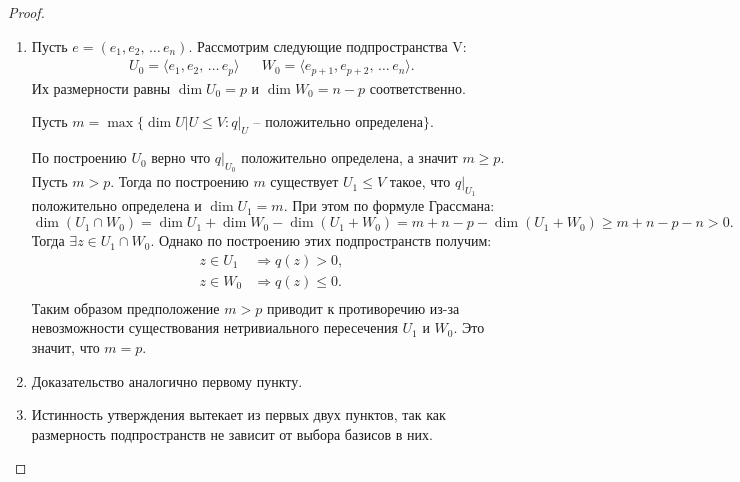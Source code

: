 \begin{proof}~
    \begin{enumerate}
        \item Пусть $e = (e_1, e_2, \, \dots \,e_n)$. Рассмотрим следующие подпространства V:
        \begin{align*}
            U_0 = \langle e_1, e_2, \, \dots \,e_p \rangle && W_0 = \langle e_{p+1}, e_{p+2}, \, \dots \,e_n\rangle. 
        \end{align*}
        Их размерности равны $\dim U_0 = p$ и $\dim W_0 = n-p$ соответственно.

        Пусть $m = \max \{ \dim U \vert U \leq V: q\vert_U \text{ -- положительно определена}\}$.

        По построению $U_0$ верно что $q \vert_{U_0}$ положительно определена, а значит $m \geq p$. Пусть $m > p$.
        Тогда по построению $m$ существует $U_1  \leq V$ такое, что $q \vert_{U_1}$ положительно определена
        и $\dim U_1 = m$.
        При этом по формуле Грассмана: 
        $$\dim (U_1 \cap W_0) = \dim U_1 + \dim W_0  - \dim (U_1 + W_0) = m + n - p - \dim (U_1 + W_0) \geq 
        m + n - p - n > 0.$$
        Тогда $\exists z \in U_1 \cap W_0$. Однако по построению этих подпространств получим:
        \begin{align*}
            z \in U_1 \, & \Rightarrow q(z) > 0, \\
            z \in W_0 & \Rightarrow q(z) \leq 0. \\
        \end{align*}
        Таким образом предположение $m > p$ приводит к противоречию из-за невозможности существования 
        нетривиального пересечения $U_1$ и $W_0$. Это значит, что $m = p$. 

        \item Доказательство аналогично первому пункту.
        \item Истинность утверждения вытекает из первых двух пунктов, так как размерность подпространств 
        не зависит от выбора базисов в них.
    \end{enumerate}
\end{proof}

